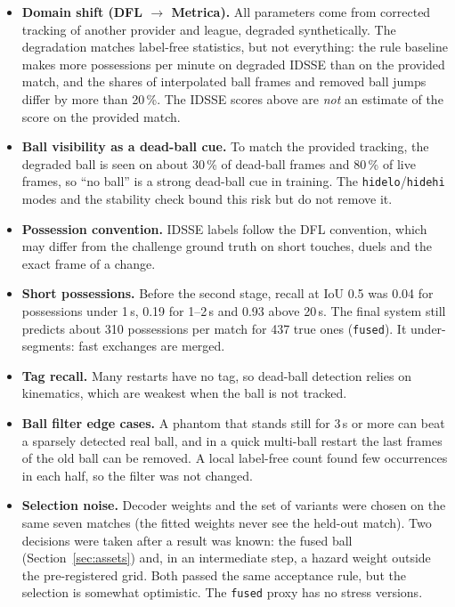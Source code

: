 \documentclass[journal]{IEEEtran}
\begin{document}
\begin{itemize}
\item \textbf{Domain shift (DFL $\rightarrow$ Metrica).} All parameters come from corrected tracking of another provider and league, degraded synthetically. The degradation matches label-free statistics, but not everything: the rule baseline makes more possessions per minute on degraded IDSSE than on the provided match, and the shares of interpolated ball frames and removed ball jumps differ by more than 20\,\%. The IDSSE scores above are \emph{not} an estimate of the score on the provided match.
\item \textbf{Ball visibility as a dead-ball cue.} To match the provided tracking, the degraded ball is seen on about 30\,\% of dead-ball frames and 80\,\% of live frames, so ``no ball'' is a strong dead-ball cue in training. The \texttt{hidelo}/\texttt{hidehi} modes and the stability check bound this risk but do not remove it.
\item \textbf{Possession convention.} IDSSE labels follow the DFL convention, which may differ from the challenge ground truth on short touches, duels and the exact frame of a change.
\item \textbf{Short possessions.} Before the second stage, recall at IoU 0.5 was 0.04 for possessions under 1\,s, 0.19 for 1--2\,s and 0.93 above 20\,s. The final system still predicts about 310 possessions per match for 437 true ones (\texttt{fused}). It under-segments: fast exchanges are merged.
\item \textbf{Tag recall.} Many restarts have no tag, so dead-ball detection relies on kinematics, which are weakest when the ball is not tracked.
\item \textbf{Ball filter edge cases.} A phantom that stands still for 3\,s or more can beat a sparsely detected real ball, and in a quick multi-ball restart the last frames of the old ball can be removed. A local label-free count found few occurrences in each half, so the filter was not changed.
\item \textbf{Selection noise.} Decoder weights and the set of variants were chosen on the same seven matches (the fitted weights never see the held-out match). Two decisions were taken after a result was known: the fused ball (Section~\ref{sec:assets}) and, in an intermediate step, a hazard weight outside the pre-registered grid. Both passed the same acceptance rule, but the selection is somewhat optimistic. The \texttt{fused} proxy has no stress versions.
\end{itemize}
\end{document}
